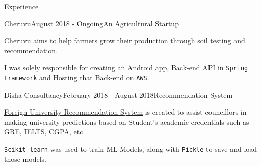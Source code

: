 \documentclass{resume} %
\begin{document}
\begin{rSection}{Experience}
\begin{rSubsection}{Cheruvu}{August 2018 - Ongoing}{An Agricultural Startup}

\item \href{https://play.google.com/store/apps/details?id=in.cheruvu.cheruvu&hl=en_IN.}{Cheruvu} aims to help farmers grow their production through soil testing and recommendation.
\item I was solely responsible for creating an Android app, Back-end API in \texttt{Spring Framework} and Hosting that Back-end on \texttt{AWS}.
\end{rSubsection} 


\begin{rSubsection}{Disha Consultancy}{February 2018 - August 2018}{Recommendation System}

\item \href{https://bitbucket.org/Jaydangar/finalyearproject/src/master/}{Foreign University Recommendation System} is created to assist councillors in making university predictions based on Student's academic credentials such as GRE, IELTS, CGPA, etc.
\item \texttt{Scikit learn} was used to train ML Models, along with \texttt{Pickle} to save and load those models.
\end{rSubsection} 
\end{rSection}
\end{document}
